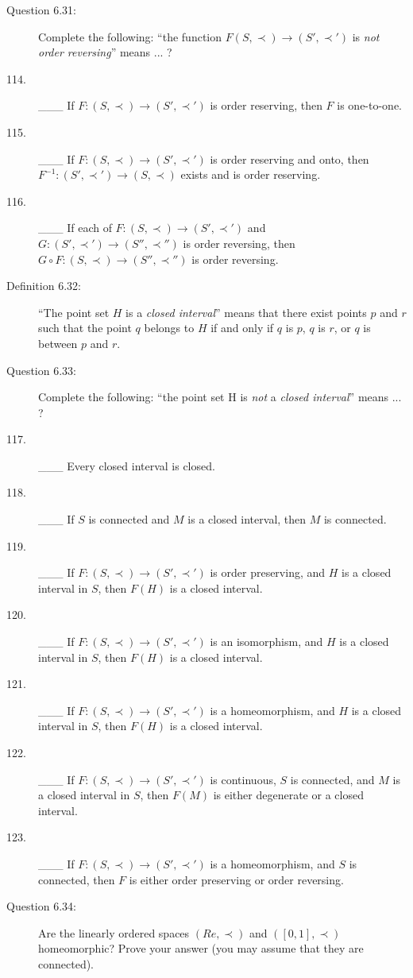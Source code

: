 \documentclass{book}
\begin{document}
\begin{description}
\item[Question 6.31:] Complete the following: ``the function $F (S, \prec) \rightarrow (S', \prec ')$ is \emph{not order reversing}'' means ... ?

\item[114.] \_\_\_ If $F: (S, \prec) \rightarrow (S', \prec ')$ is order reserving, then $F$ is one-to-one.

\item[115.] \_\_\_ If $F: (S, \prec) \rightarrow (S', \prec ')$ is order reserving and onto, then $F^{-1}: (S', \prec ') \rightarrow (S, \prec)$ exists and is order reserving.

\item[116.] \_\_\_ If each of $F: (S, \prec) \rightarrow (S', \prec ')$ and $G: (S', \prec ') \rightarrow (S'', \prec '')$ is order reversing, then $G \circ F: (S, \prec) \rightarrow (S'', \prec '')$ is order reversing.

\item[Definition 6.32:] ``The point set $H$ is a \emph{closed interval}'' means that there exist points $p$ and $r$ such that the point $q$ belongs to $H$ if and only if $q$ is $p$, $q$ is $r$, or $q$ is between $p$ and $r$.

\item[Question 6.33:] Complete the following: ``the point set H is \emph{not} a \emph{closed interval}'' means ... ?

\item[117.] \_\_\_ Every closed interval is closed.

\item[118.] \_\_\_ If $S$ is connected and $M$ is a closed interval, then $M$ is connected.

\item[119.] \_\_\_ If $F: (S, \prec) \rightarrow (S', \prec ')$ is order preserving, and $H$ is a closed interval in $S$, then $F(H)$ is a closed interval.

\item[120.] \_\_\_ If $F: (S, \prec) \rightarrow (S', \prec ')$ is an isomorphism, and $H$ is a closed interval in $S$, then $F(H)$ is a closed interval.

\item[121.] \_\_\_ If $F: (S, \prec) \rightarrow (S', \prec ')$ is a homeomorphism, and $H$ is a closed interval in $S$, then $F(H)$ is a closed interval.

\item[122.] \_\_\_ If $F: (S, \prec) \rightarrow (S', \prec ')$ is continuous, $S$ is connected, and $M$ is a closed interval in $S$, then $F(M)$ is either degenerate or a closed interval.

\item[123.] \_\_\_ If $F: (S, \prec) \rightarrow (S', \prec ')$ is a homeomorphism, and $S$ is connected, then $F$ is either order preserving or order reversing.

\item[Question 6.34:] Are the linearly ordered spaces $(Re, \prec)$ and $([0,1], \prec)$ homeomorphic? Prove your answer (you may assume that they are connected).


\end{description}
\end{document}
